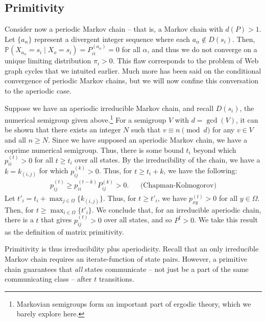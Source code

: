 \documentclass[11pt,letterpaper]{amsart}
\newcommand{\iterate}[2]{#1^{(#2)}}
\newcommand{\prob}{\mathbb{P}}
\begin{document}
\subsection{Primitivity}
Consider now a periodic Markov chain -- that is, a Markov chain with $d(P) > 1$.
Let $\{a_\alpha\}$ represent a divergent integer sequence where each
$a_\alpha \notin D(s_i)$. Then,
$\prob(X_{a_\alpha} = s_i \mid X_o = s_i) = \iterate{P}{a_\alpha}_{ii} = 0$ for
all $\alpha$, and thus we do not converge on a unique limiting distribution
$\pi_i > 0$. This flaw corresponds to the problem of Web graph cycles that we
intuited earlier. Much more has been said on the conditional convergence of
periodic Markov chains, but we will now confine this conversation to the
aperiodic case.

Suppose we have an aperiodic irreducible Markov chain, and recall $D(s_i)$, the
numerical semigroup given above.\footnote{Markovian semigroups form an important
  part of ergodic theory, which we barely explore here.} For a semigroup $V$
with $d=\gcd(V)$, it can be shown that there exists an integer $N$ such that
$v\equiv n \pmod{d}$ for any $v\in V$ and all $n \geq N$. Since we have supposed
an aperiodic Markov chain, we have a coprime numerical semigroup. Thus, there is
some bound $t_i$ beyond which $\iterate{p}{t}_{ii} > 0$ for all $t \geq t_i$
over all states. By the irreducibility of the chain, we have a $k = k_{(i,j)}$
for which $\iterate{p}{k}_{ij} > 0$. Thus, for $t \geq t_i + k$, we have the
following:
\begin{align*}
  \iterate{p}{t}_{ij} \geq \iterate{p}{t-k}_{ii} \iterate{P}{k}_{ij} > 0. && \text{(Chapman-Kolmogorov)}
\end{align*}
Let $t'_i = t_i + \max_{j\in\Omega}\{ k_{(i,j)} \}$. Thus, for $t \geq t'_i$, we
have $\iterate{p}{t}_{xy} > 0$ for all $y\in\Omega$. Then, for
$t \geq \max_{i\in\Omega}\{ t'_i \}$. We conclude that, for an irreducible
aperiodic chain, there is a $t$ that gives $\iterate{p}{t}_{ij} > 0$ over all
states, and so $P^t > 0$. We take this result as the definition of matrix
primitivity.

Primitivity is thus irreducibility plus aperiodicity. Recall that an only
irreducible Markov chain requires an iterate-function of state pairs. However, a
primitive chain guarantees that \textit{all} states communicate -- not just be a
part of the same communicating class -- after $t$ transitions.
\end{document}
